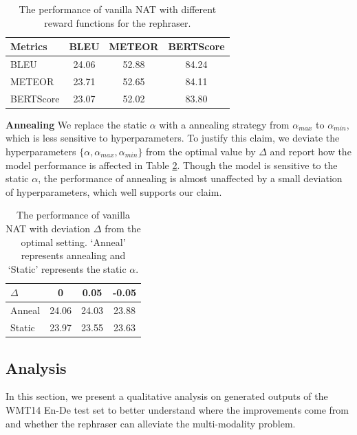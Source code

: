\documentclass[letterpaper]{article} %
\begin{document}
\begin{table}[t]
\small
\centering
\begin{tabular}{lccc}
\toprule
{\textbf{Metrics}} &BLEU& METEOR & BERTScore\\
\midrule
BLEU&24.06&52.88&84.24\\
METEOR&23.71&52.65&84.11\\
BERTScore&23.07&52.02&83.80\\
\bottomrule
\end{tabular}
\caption{The performance of vanilla NAT with different reward functions for the rephraser.}
\label{tab:reward}
\end{table}

\noindent{}\textbf{Annealing} We replace the static $\alpha$ with a annealing strategy from $\alpha_{max}$ to $\alpha_{min}$, which is less sensitive to hyperparameters. To justify this claim, we deviate the hyperparameters $\{\alpha,\alpha_{max},\alpha_{min}\}$ from the optimal value by $\Delta$ and report how the model performance is affected in Table \ref{tab:curr}. Though the model is sensitive to the static $\alpha$, the performance of annealing is almost unaffected by a small deviation of hyperparameters, which well supports our claim.
\begin{table}[t]
\small
\centering
\begin{tabular}{lccc}
\toprule
$\Delta$ &0& 0.05 & -0.05\\
\midrule
Anneal&24.06&24.03&23.88\\
Static&23.97&23.55&23.63\\
\bottomrule
\end{tabular}
\caption{The performance of vanilla NAT with deviation $\Delta$ from the optimal setting. `Anneal' represents annealing and `Static' represents the static $\alpha$.}
\label{tab:curr}
\end{table}



\subsection{Analysis}
In this section, we present a qualitative analysis on generated outputs of the WMT14 En-De test set to better understand where the improvements come from and whether the rephraser can alleviate the multi-modality problem.
\end{document}
